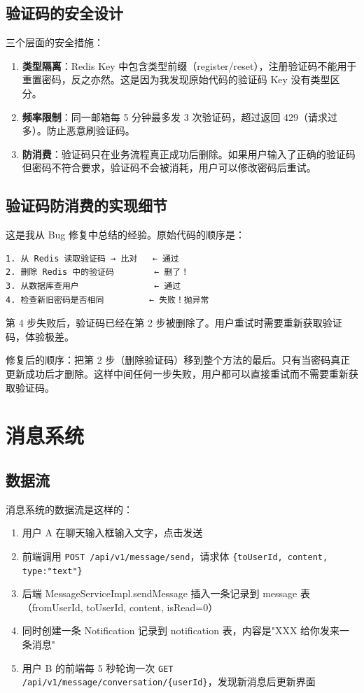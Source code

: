 \documentclass[12pt,a4paper]{ctexart}
\begin{document}
\subsection{验证码的安全设计}

三个层面的安全措施：

\begin{enumerate}
  \item \textbf{类型隔离}：Redis Key 中包含类型前缀（register/reset），注册验证码不能用于重置密码，反之亦然。这是因为我发现原始代码的验证码 Key 没有类型区分。
  \item \textbf{频率限制}：同一邮箱每 5 分钟最多发 3 次验证码，超过返回 429（请求过多）。防止恶意刷验证码。
  \item \textbf{防消费}：验证码只在业务流程真正成功后删除。如果用户输入了正确的验证码但密码不符合要求，验证码不会被消耗，用户可以修改密码后重试。
\end{enumerate}

\subsection{验证码防消费的实现细节}

这是我从 Bug 修复中总结的经验。原始代码的顺序是：

\begin{verbatim}
1. 从 Redis 读取验证码 → 比对   ← 通过
2. 删除 Redis 中的验证码        ← 删了！
3. 从数据库查用户               ← 通过
4. 检查新旧密码是否相同         ← 失败！抛异常
\end{verbatim}

第 4 步失败后，验证码已经在第 2 步被删除了。用户重试时需要重新获取验证码，体验极差。

修复后的顺序：把第 2 步（删除验证码）移到整个方法的最后。只有当密码真正更新成功后才删除。这样中间任何一步失败，用户都可以直接重试而不需要重新获取验证码。

\section{消息系统}

\subsection{数据流}

消息系统的数据流是这样的：

\begin{enumerate}
  \item 用户 A 在聊天输入框输入文字，点击发送
  \item 前端调用 \texttt{POST /api/v1/message/send}，请求体 \texttt{\{toUserId, content, type:"text"\}}
  \item 后端 MessageServiceImpl.sendMessage 插入一条记录到 message 表（fromUserId, toUserId, content, isRead=0）
  \item 同时创建一条 Notification 记录到 notification 表，内容是"XXX 给你发来一条消息"
  \item 用户 B 的前端每 5 秒轮询一次 \texttt{GET /api/v1/message/conversation/\{userId\}}，发现新消息后更新界面
\end{enumerate}
\end{document}
